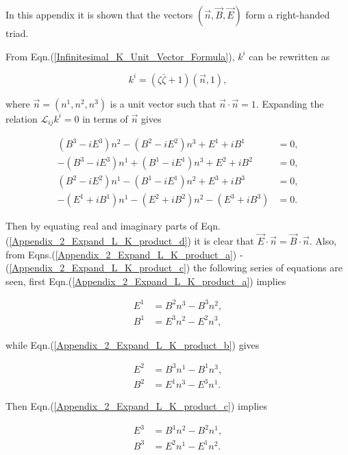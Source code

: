 \begin{appendix}
In this appendix it is shown that the vectors $(\vec{n}, \vec{B}, \vec{E})$ form a right-handed triad. 

From Eqn.(\ref{Infinitesimal_K_Unit_Vector_Formula}), $k^i$ can be rewritten as

\begin{equation*}
k^i = (\zeta \bar{\zeta} + 1)(\vec{n}, 1),
\end{equation*}

\noindent where $\vec{n} = (n^1, n^2, n^3)$ is a unit vector such that $\vec{n} \cdot \vec{n} = 1$. Expanding the relation $\mathcal{L}_{ij} k^i = 0$ in terms of $\vec{n}$ gives

\begin{subequations}
\begin{align}
\label{Appendix_2_Expand_L_K_product_a}
(B^3 - i E^3)n^2 - (B^2 - i E^2)n^3 + E^1 + iB^1 & = 0, 
\\\label{Appendix_2_Expand_L_K_product_b}
-(B^3 - i E^3)n^1 + (B^1 - i E^1)n^3 + E^2 + iB^2 & = 0, 
\\\label{Appendix_2_Expand_L_K_product_c}
(B^2 - i E^2)n^1 - (B^1 - i E^1)n^2 + E^3 + iB^3 & = 0, 
\\\label{Appendix_2_Expand_L_K_product_d}
-(E^1 + i B^1)n^1 - (E^2 + iB^2)n^2 - (E^3 + iB^3) & = 0.
\end{align}
\end{subequations}

\noindent Then by equating real and imaginary parts of Eqn.(\ref{Appendix_2_Expand_L_K_product_d}) it is clear that  $\vec{E} \cdot \vec{n} = \vec{B} \cdot \vec{n}$. Also, from Eqns.(\ref{Appendix_2_Expand_L_K_product_a}) - (\ref{Appendix_2_Expand_L_K_product_c}) the following series of equations are seen, first Eqn.(\ref{Appendix_2_Expand_L_K_product_a}) implies

\begin{align*}
E^1 & = B^2 n^3 - B^3 n^2, \\
B^1 & = E^3 n^2 - E^2 n^3, 
\end{align*}

\noindent while Eqn.(\ref{Appendix_2_Expand_L_K_product_b}) gives

\begin{align*} 
E^2 & = B^3 n^1 - B^1n^3, \\
B^2 & = E^1 n^3 - E^3 n^1.
\end{align*} 

\noindent Then Eqn.(\ref{Appendix_2_Expand_L_K_product_c}) implies

\begin{align*}
E^3 & = B^1 n^2 - B^2 n^1,\\
B^3 & = E^2 n^1 - E^1 n^2.
\end{align*}


\end{appendix}

